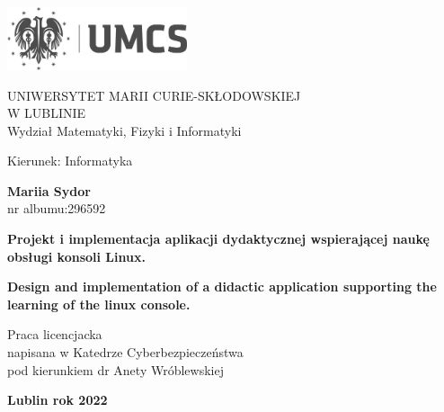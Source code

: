 \documentclass[10pt,a4paper]{report}
\begin{document}
\begin{flushleft}
\includegraphics[width=200px]{img/UMCS_skrocone_12G_PL_gray}

\vspace{1cm}
\begin{adjustwidth}{1.5in}{0cm}
\Large 
UNIWERSYTET MARII CURIE-SKŁODOWSKIEJ \\ W LUBLINIE \\
Wydział Matematyki, Fizyki i Informatyki
\end{adjustwidth}

\vspace{1cm}
\begin{adjustwidth}{1.2in}{0cm}

\begin{mdframed}[linewidth=0.5, topline=false,rightline=false,bottomline=false]
\normalsize 
\vspace{0.5cm}
 Kierunek: Informatyka 
 
 \vspace{1cm}
 
 \textbf{Mariia Sydor} \\ 
 nr albumu:296592 
 
 \vspace{2cm}
 \Large
 \textbf{Projekt i implementacja aplikacji dydaktycznej wspierającej naukę obsługi konsoli Linux.} \\

\vspace{0.5cm}

\normalsize 
\textbf{Design and implementation of a didactic application supporting the \\ learning of the linux console.} 
\vspace{2cm}
 
 Praca licencjacka \\
 napisana w Katedrze Cyberbezpieczeństwa \\
 pod kierunkiem dr Anety Wróblewskiej
 \vspace{0.5cm}
 
\end{mdframed}

\vspace{1cm}
\begin{adjustwidth}{0.5cm}{0cm}
\textbf{Lublin  rok 2022}
\end{adjustwidth}
\thispagestyle{empty}
\end{adjustwidth}
\end{flushleft}
\end{document}
